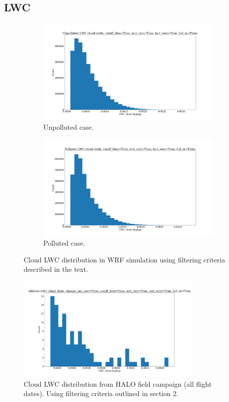 \documentclass{article}
\begin{document}
\subsection{LWC}

\begin{figure}[ht]
	\centering
	\begin{subfigure}{0.7\textwidth}
		\includegraphics[width=\textwidth]{revmywrf/v9_lwc_hist_Unpolluted_figure.png}
		\caption{Unpolluted case.}
		\label{wrflwchistunpoll}
	\end{subfigure}
	\begin{subfigure}{0.7\textwidth}
		\includegraphics[width=\textwidth]{revmywrf/v9_lwc_hist_Polluted_figure.png}
		\caption{Polluted case.}
		\label{wrflwchistpoll}
	\end{subfigure}
	\caption{Cloud LWC distribution in WRF simulation using filtering criteria described in the text.}
	\label{wrflwchist}
\end{figure}
\begin{figure}[ht]
    \centering
    \includegraphics[width=9cm]{revhalo/v24_lwc_hist_cas_alldates_figure.png}
    \caption{Cloud LWC distribution from HALO field campaign (all flight dates). Using filtering criteria outlined in section 2.}
    \label{halolwchist}
\end{figure}
\end{document}
